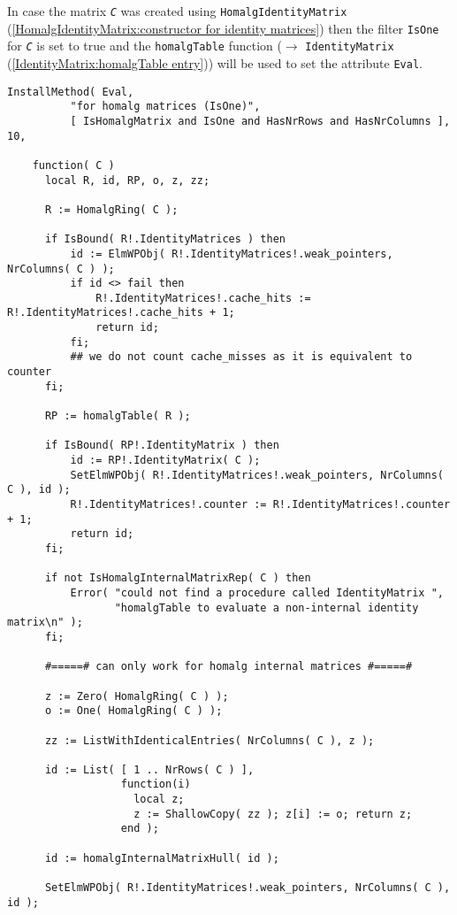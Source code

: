 \documentclass[a4paper,11pt]{report}
\begin{document}
{{{ In case the matrix \mbox{\texttt{\mdseries\slshape C}} was created using \texttt{HomalgIdentityMatrix} (\ref{HomalgIdentityMatrix:constructor for identity matrices}) then the filter \texttt{IsOne} for \mbox{\texttt{\mdseries\slshape C}} is set to true and the \texttt{homalgTable} function ($\to$ \texttt{IdentityMatrix} (\ref{IdentityMatrix:homalgTable entry})) will be used to set the attribute \texttt{Eval}. 
\begin{Verbatim}[fontsize=\small,frame=single,label=Code]
  InstallMethod( Eval,
          "for homalg matrices (IsOne)",
          [ IsHomalgMatrix and IsOne and HasNrRows and HasNrColumns ], 10,
          
    function( C )
      local R, id, RP, o, z, zz;
      
      R := HomalgRing( C );
      
      if IsBound( R!.IdentityMatrices ) then
          id := ElmWPObj( R!.IdentityMatrices!.weak_pointers, NrColumns( C ) );
          if id <> fail then
              R!.IdentityMatrices!.cache_hits := R!.IdentityMatrices!.cache_hits + 1;
              return id;
          fi;
          ## we do not count cache_misses as it is equivalent to counter
      fi;
      
      RP := homalgTable( R );
      
      if IsBound( RP!.IdentityMatrix ) then
          id := RP!.IdentityMatrix( C );
          SetElmWPObj( R!.IdentityMatrices!.weak_pointers, NrColumns( C ), id );
          R!.IdentityMatrices!.counter := R!.IdentityMatrices!.counter + 1;
          return id;
      fi;
      
      if not IsHomalgInternalMatrixRep( C ) then
          Error( "could not find a procedure called IdentityMatrix ",
                 "homalgTable to evaluate a non-internal identity matrix\n" );
      fi;
      
      #=====# can only work for homalg internal matrices #=====#
      
      z := Zero( HomalgRing( C ) );
      o := One( HomalgRing( C ) );
      
      zz := ListWithIdenticalEntries( NrColumns( C ), z );
      
      id := List( [ 1 .. NrRows( C ) ],
                  function(i)
                    local z;
                    z := ShallowCopy( zz ); z[i] := o; return z;
                  end );
      
      id := homalgInternalMatrixHull( id );
      
      SetElmWPObj( R!.IdentityMatrices!.weak_pointers, NrColumns( C ), id );
      

\end{Verbatim}}}}
\end{document}
